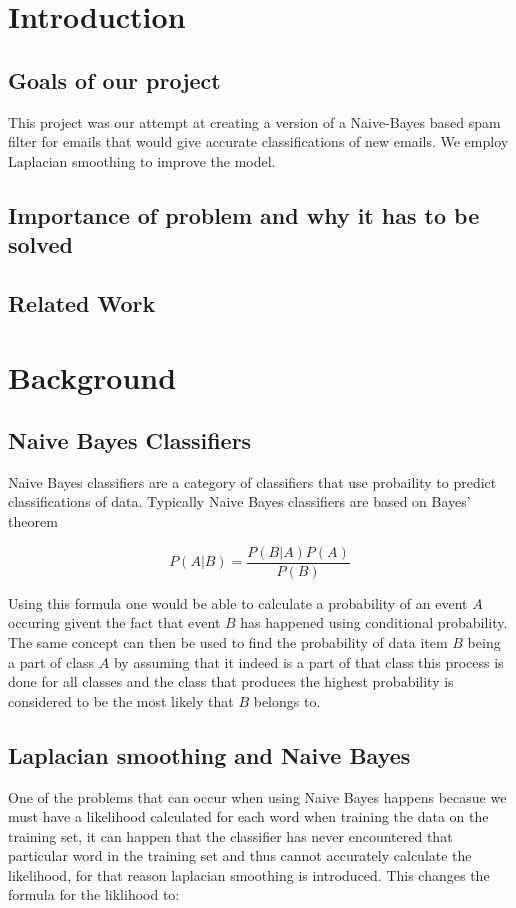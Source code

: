 \section{Introduction}

\subsection{Goals of our project}
This project was our attempt at creating a version of a Naive-Bayes based spam filter for emails that would give accurate classifications of new emails. We employ Laplacian smoothing to improve the model.

\subsection{Importance of problem and why it has to be solved}

\subsection{Related Work}

\section{Background}

\subsection{Naive Bayes Classifiers}
Naive Bayes classifiers are a category of classifiers that use probaility to predict classifications of data. Typically Naive Bayes classifiers are based on Bayes' theorem

\[P(A|B) = \frac{P(B|A)P(A)}{P(B)}\]
 
Using this formula one would be able to calculate a probability of an event \(A\) occuring givent the fact that event \(B\) has happened using conditional probability. 
The same concept can then be used to find the probability of data item \(B\) being a part of class \(A\) by assuming that it indeed is a part of that class this process is done for all classes and the class that produces the highest probability is considered to be the most likely that \(B\) belongs to.
 \subsection{Laplacian smoothing and Naive Bayes}
 One of the problems that can occur when using Naive Bayes happens becasue we must have a likelihood calculated for each word when training the data on the training set, it can happen that the classifier has never encountered that particular word in the training set and thus cannot accurately calculate the likelihood, for that reason laplacian smoothing is introduced. This changes the formula for the liklihood to:
 
